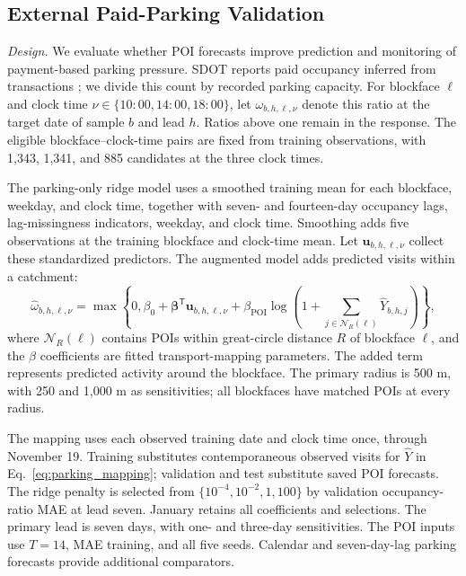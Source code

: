 \subsection{External Paid-Parking Validation}
\label{subsec:parking_validation}

\textit{Design.}
We evaluate whether POI forecasts improve prediction and monitoring of payment-based parking pressure. SDOT reports paid occupancy inferred from transactions \citep{sdot_parking_data}; we divide this count by recorded parking capacity. For blockface $\ell$ and clock time $\nu\in\{10{:}00,14{:}00,18{:}00\}$, let $\omega_{b,h,\ell,\nu}$ denote this ratio at the target date of sample $b$ and lead $h$. Ratios above one remain in the response. The eligible blockface--clock-time pairs are fixed from training observations, with 1,343, 1,341, and 885 candidates at the three clock times.

The parking-only ridge model uses a smoothed training mean for each blockface, weekday, and clock time, together with seven- and fourteen-day occupancy lags, lag-missingness indicators, weekday, and clock time. Smoothing adds five observations at the training blockface and clock-time mean. Let $\mathbf u_{b,h,\ell,\nu}$ collect these standardized predictors. The augmented model adds predicted visits within a catchment:
\begin{equation}
\widehat\omega_{b,h,\ell,\nu}
=\max\left\{0,\beta_0+\boldsymbol\beta^{\mathsf T}\mathbf u_{b,h,\ell,\nu}
+\beta_{\mathrm{POI}}\log\left(1+\sum_{j\in\mathcal N_R(\ell)}\hat Y_{b,h,j}\right)\right\},
\label{eq:parking_mapping}
\end{equation}
where $\mathcal N_R(\ell)$ contains POIs within great-circle distance $R$ of blockface $\ell$, and the $\beta$ coefficients are fitted transport-mapping parameters. The added term represents predicted activity around the blockface. The primary radius is 500 m, with 250 and 1,000 m as sensitivities; all blockfaces have matched POIs at every radius.

The mapping uses each observed training date and clock time once, through November 19. Training substitutes contemporaneous observed visits for $\hat Y$ in Eq.~\eqref{eq:parking_mapping}; validation and test substitute saved POI forecasts. The ridge penalty is selected from $\{10^{-4},10^{-2},1,100\}$ by validation occupancy-ratio MAE at lead seven. January retains all coefficients and selections. The primary lead is seven days, with one- and three-day sensitivities. The POI inputs use $T=14$, MAE training, and all five seeds. Calendar and seven-day-lag parking forecasts provide additional comparators.

